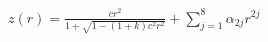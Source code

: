 \documentclass[convert={convertexe={magick.exe}}]{standalone}
\begin{document}
$ z(r) = \frac{cr^2}{1+\sqrt{1-(1+k)c^2r^2}} + \sum_{j=1}^{8} \alpha_{2j} r^{2j} $
\end{document}
